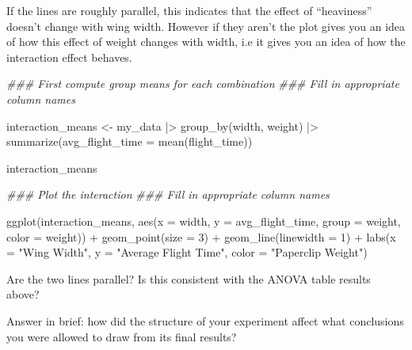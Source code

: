 \documentclass[
  letterpaper,
  DIV=11,
  numbers=noendperiod]{scrartcl}
\newenvironment{Shaded}{\begin{snugshade}}{\end{snugshade}}
\newcommand{\AttributeTok}[1]{\textcolor[rgb]{0.40,0.45,0.13}{#1}}
\newcommand{\DecValTok}[1]{\textcolor[rgb]{0.68,0.00,0.00}{#1}}
\newcommand{\DocumentationTok}[1]{\textcolor[rgb]{0.37,0.37,0.37}{\textit{#1}}}
\newcommand{\FunctionTok}[1]{\textcolor[rgb]{0.28,0.35,0.67}{#1}}
\newcommand{\NormalTok}[1]{\textcolor[rgb]{0.00,0.23,0.31}{#1}}
\newcommand{\OtherTok}[1]{\textcolor[rgb]{0.00,0.23,0.31}{#1}}
\newcommand{\SpecialCharTok}[1]{\textcolor[rgb]{0.37,0.37,0.37}{#1}}
\newcommand{\StringTok}[1]{\textcolor[rgb]{0.13,0.47,0.30}{#1}}
\begin{document}
If the lines are roughly parallel, this indicates that the effect of
``heaviness'' doesn't change with wing width. However if they aren't the
plot gives you an idea of how this effect of weight changes with width,
i.e it gives you an idea of how the interaction effect behaves.

\begin{Shaded}
\begin{Highlighting}[]
\DocumentationTok{\#\#\# First compute group means for each combination}
\DocumentationTok{\#\#\# Fill in appropriate column names}

\NormalTok{interaction\_means }\OtherTok{\textless{}{-}}\NormalTok{ my\_data }\SpecialCharTok{|\textgreater{}}
  \FunctionTok{group\_by}\NormalTok{(width, weight) }\SpecialCharTok{|\textgreater{}}
  \FunctionTok{summarize}\NormalTok{(}\AttributeTok{avg\_flight\_time =} \FunctionTok{mean}\NormalTok{(flight\_time))}

\NormalTok{interaction\_means}
\end{Highlighting}
\end{Shaded}

\begin{Shaded}
\begin{Highlighting}[]
\DocumentationTok{\#\#\# Plot the interaction}
\DocumentationTok{\#\#\# Fill in appropriate column names}

\FunctionTok{ggplot}\NormalTok{(interaction\_means,}
       \FunctionTok{aes}\NormalTok{(}\AttributeTok{x =}\NormalTok{ width,}
           \AttributeTok{y =}\NormalTok{ avg\_flight\_time,}
           \AttributeTok{group =}\NormalTok{ weight,}
           \AttributeTok{color =}\NormalTok{ weight)) }\SpecialCharTok{+}
  \FunctionTok{geom\_point}\NormalTok{(}\AttributeTok{size =} \DecValTok{3}\NormalTok{) }\SpecialCharTok{+}
  \FunctionTok{geom\_line}\NormalTok{(}\AttributeTok{linewidth =} \DecValTok{1}\NormalTok{) }\SpecialCharTok{+}
  \FunctionTok{labs}\NormalTok{(}\AttributeTok{x =} \StringTok{"Wing Width"}\NormalTok{,}
       \AttributeTok{y =} \StringTok{"Average Flight Time"}\NormalTok{,}
       \AttributeTok{color =} \StringTok{"Paperclip Weight"}\NormalTok{)}
\end{Highlighting}
\end{Shaded}

Are the two lines parallel? Is this consistent with the ANOVA table
results above?

\hfill\break
\hfill\break
\hfill\break
\hfill\break

Answer in brief: how did the structure of your experiment affect what
conclusions you were allowed to draw from its final results?

\hfill\break
\hfill\break
\hfill\break
\hfill\break
\end{document}
